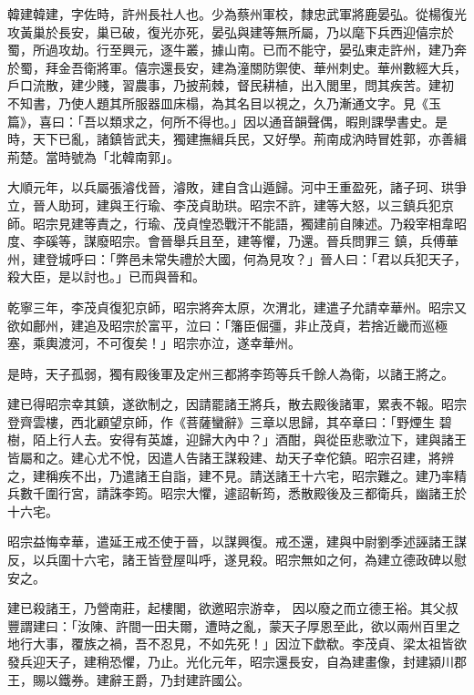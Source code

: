 \begin{pinyinscope}
 韓建韓建，字佐時，許州長社人也。少為蔡州軍校，隸忠武軍將鹿晏弘。從楊復光攻黃巢於長安，巢已破，復光亦死，晏弘與建等無所屬，乃以麾下兵西迎僖宗於蜀，所過攻劫。行至興元，逐牛叢，據山南。已而不能守，晏弘東走許州，建乃奔於蜀，拜金吾衛將軍。僖宗還長安，建為潼關防禦使、華州刺史。華州數經大兵，戶口流散，建少賤，習農事，乃披荊棘，督民耕植，出入閭里，問其疾苦。建初
 不知書，乃使人題其所服器皿床榻，為其名目以視之，久乃漸通文字。見《玉篇》，喜曰：「吾以類求之，何所不得也。」因以通音韻聲偶，暇則課學書史。是時，天下已亂，諸鎮皆武夫，獨建撫緝兵民，又好學。荊南成汭時冒姓郭，亦善緝荊楚。當時號為「北韓南郭」。



 大順元年，以兵屬張濬伐晉，濬敗，建自含山遁歸。河中王重盈死，諸子珂、珙爭立，晉人助珂，建與王行瑜、李茂貞助珙。昭宗不許，建等大怒，以三鎮兵犯京師。昭宗見建等責之，行瑜、茂貞惶恐戰汗不能語，獨建前自陳述。乃殺宰相韋昭度、李磎等，謀廢昭宗。會晉舉兵且至，建等懼，乃還。晉兵問罪三
 鎮，兵傅華州，建登城呼曰：「弊邑未常失禮於大國，何為見攻？」晉人曰：「君以兵犯天子，殺大臣，是以討也。」已而與晉和。



 乾寧三年，李茂貞復犯京師，昭宗將奔太原，次渭北，建遣子允請幸華州。昭宗又欲如鄜州，建追及昭宗於富平，泣曰：「籓臣倔彊，非止茂貞，若捨近畿而巡極塞，乘輿渡河，不可復矣！」昭宗亦泣，遂幸華州。



 是時，天子孤弱，獨有殿後軍及定州三都將李筠等兵千餘人為衛，以諸王將之。



 建已得昭宗幸其鎮，遂欲制之，因請罷諸王將兵，散去殿後諸軍，累表不報。昭宗登齊雲樓，西北顧望京師，作《菩薩蠻辭》三章以思歸，其卒章曰：「野煙生
 碧樹，陌上行人去。安得有英雄，迎歸大內中？」酒酣，與從臣悲歌泣下，建與諸王皆屬和之。建心尤不悅，因遣人告諸王謀殺建、劫天子幸佗鎮。昭宗召建，將辨之，建稱疾不出，乃遣諸王自詣，建不見。請送諸王十六宅，昭宗難之。建乃率精兵數千圍行宮，請誅李筠。昭宗大懼，遽詔斬筠，悉散殿後及三都衛兵，幽諸王於十六宅。



 昭宗益悔幸華，遣延王戒丕使于晉，以謀興復。戒丕還，建與中尉劉季述誣諸王謀反，以兵圍十六宅，諸王皆登屋叫呼，遂見殺。昭宗無如之何，為建立德政碑以慰安之。



 建已殺諸王，乃營南莊，起樓閣，欲邀昭宗游幸，
 因以廢之而立德王裕。其父叔豐謂建曰：「汝陳、許間一田夫爾，遭時之亂，蒙天子厚恩至此，欲以兩州百里之地行大事，覆族之禍，吾不忍見，不如先死！」因泣下歔欷。李茂貞、梁太祖皆欲發兵迎天子，建稍恐懼，乃止。光化元年，昭宗還長安，自為建畫像，封建潁川郡王，賜以鐵券。建辭王爵，乃封建許國公。




\end{pinyinscope}

